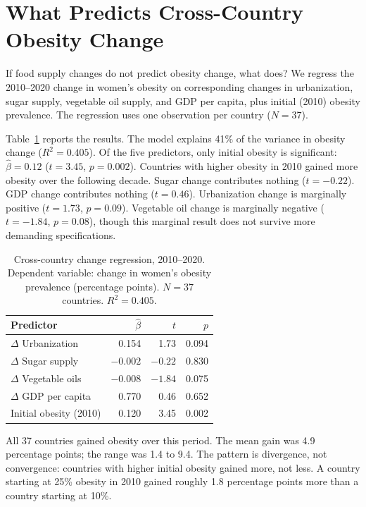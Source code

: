 \section{What Predicts Cross-Country Obesity Change}

If food supply changes do not predict obesity change, what does? We regress the 2010--2020 change in women's obesity on corresponding changes in urbanization, sugar supply, vegetable oil supply, and GDP per capita, plus initial (2010) obesity prevalence. The regression uses one observation per country ($N = 37$).

Table~\ref{tab:change} reports the results. The model explains 41\% of the variance in obesity change ($R^2 = 0.405$). Of the five predictors, only initial obesity is significant: $\hat{\beta} = 0.12$ ($t = 3.45$, $p = 0.002$). Countries with higher obesity in 2010 gained more obesity over the following decade. Sugar change contributes nothing ($t = -0.22$). GDP change contributes nothing ($t = 0.46$). Urbanization change is marginally positive ($t = 1.73$, $p = 0.09$). Vegetable oil change is marginally negative ($t = -1.84$, $p = 0.08$), though this marginal result does not survive more demanding specifications.

\begin{table}[htbp]
\centering
\caption{Cross-country change regression, 2010--2020. Dependent variable: change in women's obesity prevalence (percentage points). $N = 37$ countries. $R^2 = 0.405$.}
\label{tab:change}
\small
\begin{tabular}{lrrr}
\toprule
Predictor & $\hat{\beta}$ & $t$ & $p$ \\
\midrule
$\Delta$ Urbanization & 0.154 & 1.73 & 0.094 \\
$\Delta$ Sugar supply & $-0.002$ & $-0.22$ & 0.830 \\
$\Delta$ Vegetable oils & $-0.008$ & $-1.84$ & 0.075 \\
$\Delta$ GDP per capita & 0.770 & 0.46 & 0.652 \\
Initial obesity (2010) & 0.120 & 3.45 & 0.002 \\
\bottomrule
\end{tabular}
\end{table}

All 37 countries gained obesity over this period. The mean gain was 4.9 percentage points; the range was 1.4 to 9.4. The pattern is divergence, not convergence: countries with higher initial obesity gained more, not less. A country starting at 25\% obesity in 2010 gained roughly 1.8 percentage points more than a country starting at 10\%.


